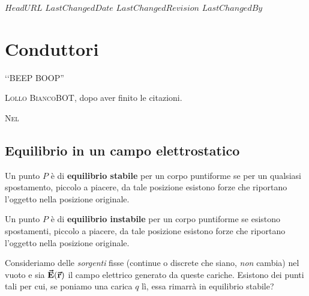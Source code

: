 \svnidlong
{$HeadURL$}
{$LastChangedDate$}
{$LastChangedRevision$}
{$LastChangedBy$}

\chapter{Conduttori}

\begin{introduction}
	‘‘BEEP BOOP''
	\begin{flushright}
		\textsc{Lollo BiancoBOT}, dopo aver finito le citazioni. %
	\end{flushright}
\end{introduction}
\lettrine[findent=1pt, nindent=0pt]{N}{el} %

\section{Equilibrio in un campo elettrostatico}
\begin{define}
	Un punto $P$ è di \textbf{equilibrio stabile} per un corpo puntiforme se per un qualsiasi spostamento, piccolo a piacere, da tale posizione esistono forze che riportano l'oggetto nella posizione originale.
\end{define}
\begin{define}
	Un punto $P$ è di \textbf{equilibrio instabile} per un corpo puntiforme se esistono spostamenti, piccolo a piacere, da tale posizione esistono forze che riportano l'oggetto nella posizione originale.
\end{define}
Consideriamo delle \textit{sorgenti} fisse (continue o discrete che siano, \textit{non} cambia) nel vuoto e sia $\vb*{\va{E}}(\vb*{\va{r}})$ il campo elettrico generato da queste cariche. Esistono dei punti tali per cui, se poniamo una carica $q$ lì, essa rimarrà in equilibrio stabile?

